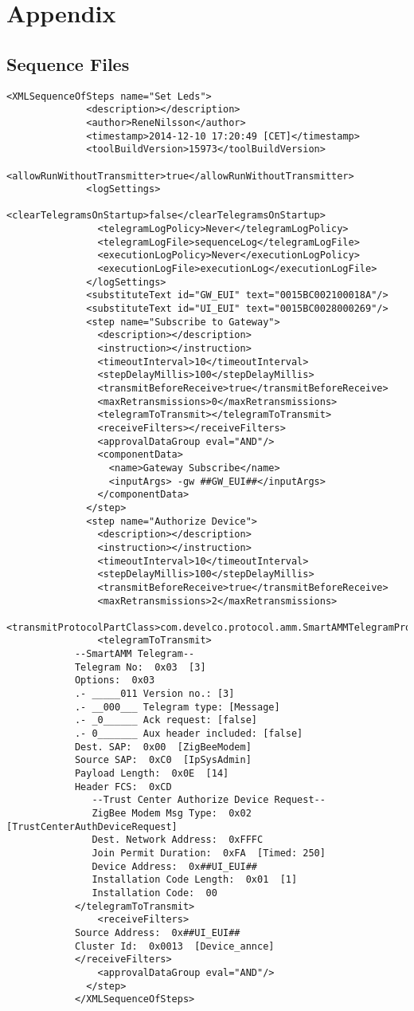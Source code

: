 \documentclass[Main]{subfiles}
\begin{document}
\section{Appendix} %
\label{sec:appendix}


	\subsection{Sequence Files} \label{sec:appendix_a}
		\begin{lstlisting}[caption=Authorizing End Device, style=Code-XML]
			<XMLSequenceOfSteps name="Set Leds">
			  <description></description>
			  <author>ReneNilsson</author>
			  <timestamp>2014-12-10 17:20:49 [CET]</timestamp>
			  <toolBuildVersion>15973</toolBuildVersion>
			  <allowRunWithoutTransmitter>true</allowRunWithoutTransmitter>
			  <logSettings>
			    <clearTelegramsOnStartup>false</clearTelegramsOnStartup>
			    <telegramLogPolicy>Never</telegramLogPolicy>
			    <telegramLogFile>sequenceLog</telegramLogFile>
			    <executionLogPolicy>Never</executionLogPolicy>
			    <executionLogFile>executionLog</executionLogFile>
			  </logSettings>
			  <substituteText id="GW_EUI" text="0015BC002100018A"/>
			  <substituteText id="UI_EUI" text="0015BC0028000269"/>
			  <step name="Subscribe to Gateway">
			    <description></description>
			    <instruction></instruction>
			    <timeoutInterval>10</timeoutInterval>
			    <stepDelayMillis>100</stepDelayMillis>
			    <transmitBeforeReceive>true</transmitBeforeReceive>
			    <maxRetransmissions>0</maxRetransmissions>
			    <telegramToTransmit></telegramToTransmit>
			    <receiveFilters></receiveFilters>
			    <approvalDataGroup eval="AND"/>
			    <componentData>
			      <name>Gateway Subscribe</name>
			      <inputArgs> -gw ##GW_EUI##</inputArgs>
			    </componentData>
			  </step>
			  <step name="Authorize Device">
			    <description></description>
			    <instruction></instruction>
			    <timeoutInterval>10</timeoutInterval>
			    <stepDelayMillis>100</stepDelayMillis>
			    <transmitBeforeReceive>true</transmitBeforeReceive>
			    <maxRetransmissions>2</maxRetransmissions>
			    <transmitProtocolPartClass>com.develco.protocol.amm.SmartAMMTelegramProtocol</transmitProtocolPartClass>
			    <telegramToTransmit>
			--SmartAMM Telegram--
			Telegram No:  0x03  [3]
			Options:  0x03  
			.- _____011 Version no.: [3]
			.- __000___ Telegram type: [Message]
			.- _0______ Ack request: [false]
			.- 0_______ Aux header included: [false]
			Dest. SAP:  0x00  [ZigBeeModem]
			Source SAP:  0xC0  [IpSysAdmin]
			Payload Length:  0x0E  [14]
			Header FCS:  0xCD
			   --Trust Center Authorize Device Request--
			   ZigBee Modem Msg Type:  0x02  [TrustCenterAuthDeviceRequest]
			   Dest. Network Address:  0xFFFC
			   Join Permit Duration:  0xFA  [Timed: 250]
			   Device Address:  0x##UI_EUI##
			   Installation Code Length:  0x01  [1]
			   Installation Code:  00
			</telegramToTransmit>
			    <receiveFilters>
			Source Address:  0x##UI_EUI##
			Cluster Id:  0x0013  [Device_annce]
			</receiveFilters>
			    <approvalDataGroup eval="AND"/>
			  </step>
			</XMLSequenceOfSteps>
		\end{lstlisting}
\end{document}
